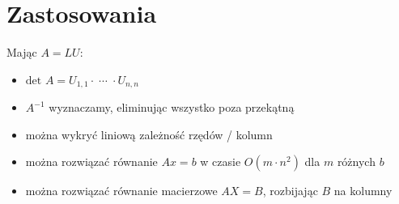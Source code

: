\section{Zastosowania}
Mając \( A = LU \):
\begin{itemize}
	\onehalfspacing
	\item \( \text{det }A = U_{1,1} \cdot \;\cdots\; \cdot U_{n,n} \)
	\item \( A^{-1} \) wyznaczamy, eliminując wszystko poza przekątną
	\item można wykryć liniową zależność rzędów / kolumn
	\item można rozwiązać równanie \( Ax = b \) w czasie \( O(m\cdot n^2) \) dla \( m \) różnych \(b \)
	\item można rozwiązać równanie macierzowe \( AX = B \), rozbijając \( B \) na kolumny
\end{itemize}